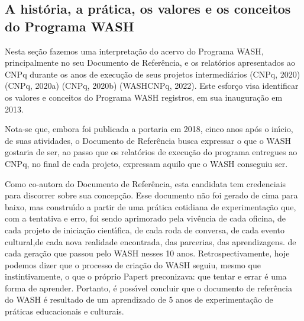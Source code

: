 \documentclass[
12pt,		%
openright,	%
twoside,  %
a4paper,			%
chapter=TITLE,		%
english,			%
french,				%
spanish,			%
brazil				%
]{USPSC-classe/USPSC}
\begin{document}
\subsection[A hist\'oria, a pr\'atica, os valores e os conceitos do Programa WASH]{A hist\'oria, a pr\'atica, os valores e os conceitos do Programa WASH}\label{A hist\'oria, a pr\'atica, os valores e os conceitos do Programa WASH}
Nesta se\c{c}\~ao fazemos uma interpreta\c{c}\~ao do acervo do Programa WASH, principalmente no seu Documento de Refer\^encia, e os relat\'orios apresentados ao CNPq durante os anos de execu\c{c}\~ao de seus projetos intermedi\'arios  (CNPq, 2020)   (CNPq, 2020a)  (CNPq, 2020b)  (WASHCNPq, 2022). Este esfor\c{c}o visa identificar os valores e conceitos do Programa WASH registros, em sua inaugura\c{c}\~ao em 2013.

















Nota-se que, embora foi publicada a portaria em 2018, cinco anos ap\'os o in\'{\i}cio, de suas atividades, o Documento de Refer\^encia busca expressar \textquotedbl o que o WASH gostaria de ser\textquotedbl , ao passo que os relat\'orios de execu\c{c}\~ao do programa entregues ao CNPq, no final de cada projeto, expressam \textquotedbl aquilo que o WASH conseguiu ser\textquotedbl .

















Como co-autora do Documento de Refer\^encia, esta candidata tem credenciais para discorrer sobre sua concep\c{c}\~ao. Esse documento n\~ao foi gerado de cima para baixo, mas constru\'{\i}do a partir de uma pr\'atica cotidiana de experimenta\c{c}\~ao que, com a \textquotedbl tentativa e erro\textquotedbl , foi sendo aprimorado pela viv\^encia de cada oficina, de cada projeto de inicia\c{c}\~ao cient\'{\i}fica, de cada roda de conversa, de cada  evento cultural,de cada nova realidade encontrada, das parcerias, das aprendizagens. de cada gera\c{c}\~ao que passou pelo WASH nesses 10 anos. Retrospectivamente, hoje podemos dizer que o processo de cria\c{c}\~ao do WASH seguiu, mesmo que instintivamente, o que o pr\'oprio Papert preconizava: que tentar e errar \'e uma forma de aprender. Portanto, \'e poss\'{\i}vel concluir que o documento de refer\^encia do WASH \'e resultado de um aprendizado de 5 anos de experimenta\c{c}\~ao de pr\'aticas educacionais e culturais.
\end{document}
